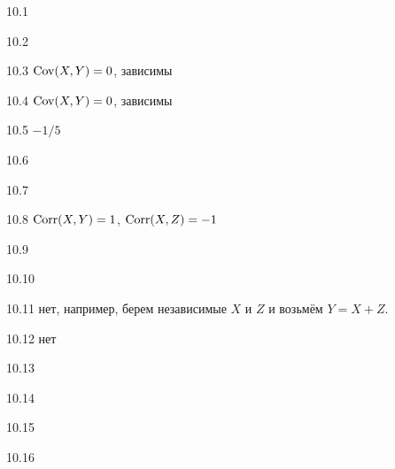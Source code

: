 \protect \hypertarget {soln:10.1}{}
\begin{solution}{{10.1}}
\end{solution}
\protect \hypertarget {soln:10.2}{}
\begin{solution}{{10.2}}
\end{solution}
\protect \hypertarget {soln:10.3}{}
\begin{solution}{{10.3}}
      $\operatorname{Cov}(X,Y)=0$, зависимы
\end{solution}
\protect \hypertarget {soln:10.4}{}
\begin{solution}{{10.4}}
  $\operatorname{Cov}(X,Y)=0$, зависимы
\end{solution}
\protect \hypertarget {soln:10.5}{}
\begin{solution}{{10.5}}
  $-1/5$
\end{solution}
\protect \hypertarget {soln:10.6}{}
\begin{solution}{{10.6}}
\end{solution}
\protect \hypertarget {soln:10.7}{}
\begin{solution}{{10.7}}
\end{solution}
\protect \hypertarget {soln:10.8}{}
\begin{solution}{{10.8}}
$\operatorname{Corr}(X,Y)=1$, $\operatorname{Corr}(X,Z)=-1$
\end{solution}
\protect \hypertarget {soln:10.9}{}
\begin{solution}{{10.9}}
\end{solution}
\protect \hypertarget {soln:10.10}{}
\begin{solution}{{10.10}}
\end{solution}
\protect \hypertarget {soln:10.11}{}
\begin{solution}{{10.11}}
  нет, например, берем независимые $X$ и $Z$ и возьмём $Y=X+Z$.
\end{solution}
\protect \hypertarget {soln:10.12}{}
\begin{solution}{{10.12}}
нет
\end{solution}
\protect \hypertarget {soln:10.13}{}
\begin{solution}{{10.13}}
\end{solution}
\protect \hypertarget {soln:10.14}{}
\begin{solution}{{10.14}}
\end{solution}
\protect \hypertarget {soln:10.15}{}
\begin{solution}{{10.15}}
\end{solution}
\protect \hypertarget {soln:10.16}{}
\begin{solution}{{10.16}}
\end{solution}
